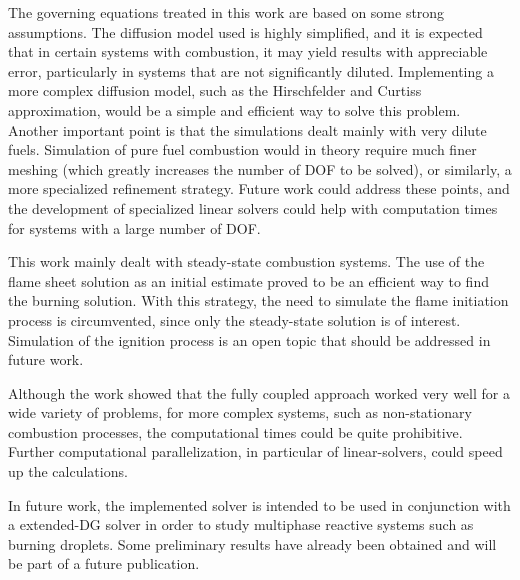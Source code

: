 The governing equations treated in this work are based on some strong assumptions.
The diffusion model used is highly simplified, and it is expected that in certain systems with combustion, it may yield results with appreciable error, particularly in systems that are not significantly diluted. Implementing a more complex diffusion model, such as the Hirschfelder and Curtiss approximation, would be a simple and efficient way to solve this problem. 
Another important point is that the simulations dealt mainly with very dilute fuels. Simulation of pure fuel combustion would in theory require much finer meshing (which greatly increases the number of DOF to be solved), or similarly, a more specialized refinement strategy. Future work could address these points, and the development of specialized linear solvers could help with computation times for systems with a large number of DOF.

This work mainly dealt with steady-state combustion systems. The use of the flame sheet solution as an initial estimate proved to be an efficient way to find the burning solution. With this strategy, the need to simulate the flame initiation process is circumvented, since only the steady-state solution is of interest.  Simulation of the ignition process is an open topic that should be addressed in future work. 

Although the work showed that the fully coupled approach worked very well for a wide variety of problems, for more complex systems, such as non-stationary combustion processes, the computational times could be quite prohibitive. Further computational parallelization, in particular of linear-solvers, could speed up the calculations. 

In future work, the implemented solver is intended to be used in conjunction with a extended-DG solver \parencite{kummerExtendedDiscontinuousGalerkin2017,kummerBoSSSPackageMultigrid2021,krauseIncompressibleImmersedBoundary2017} in order to study multiphase reactive systems such as burning droplets. Some preliminary results have already been obtained and will be part of a future publication.

